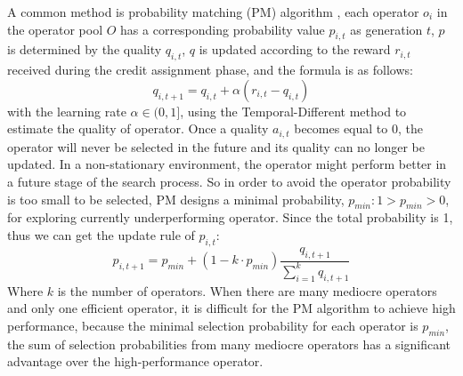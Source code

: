 \documentclass[journal]{IEEEtran}
\begin{document}
A common method is probability matching (PM) algorithm \cite{thierens2007adaptive}, each operator $o_i$ in the operator pool $O$ has a corresponding probability value $p_{i,t}$ as generation $t$, $p$ is determined by the quality $q_{i,t}$, $q$ is updated according to the reward $r_{i,t}$ received during the credit assignment phase, and the formula is as follows:
\begin{equation}
  q_{i,t+1} = q_{i,t} + \alpha(r_{i,t} - q_{i,t})
  \label{eq: pm_q}
\end{equation}
with the learning rate $\alpha \in (0,1]$, using the Temporal-Different method to estimate the quality of operator.
Once a quality $a_{i,t}$ becomes equal to 0, the operator will never be selected in the future and its quality can no longer be updated.
In a non-stationary environment, the operator might perform better in a future stage of the search process.
So in order to avoid the operator probability is too small to be selected, PM designs a minimal probability, $p_{min}: 1 > p_{min} > 0$, for exploring currently underperforming operator. Since the total probability is 1, thus we can get the update rule of $p_{i,t}$:
\begin{equation}
  p_{i,t+1} = p_{min} + (1-k \cdot p_{min}) \frac{q_{i,t+1}}{\sum_{i=1}^k q_{i,t+1}}
  \label{eq: pm_p}
\end{equation}
Where $k$ is the number of operators.
When there are many mediocre operators and only one efficient operator, it is difficult for the PM algorithm to achieve high performance, because the minimal selection probability for each operator is $p_{min}$, the sum of selection probabilities from many mediocre operators has a significant advantage over the high-performance operator.
\end{document}
